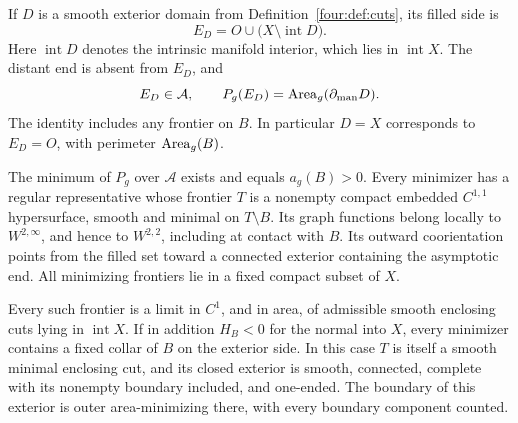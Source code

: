 If $D$ is a smooth exterior domain from Definition~\ref{four:def:cuts}, its
filled side is
\[
 E_D=O\cup\bigl(X\setminus\operatorname{int}D\bigr).
\]
Here $\operatorname{int}D$ denotes the intrinsic manifold interior, which
lies in $\operatorname{int}X$. The distant end is absent from $E_D$, and
\begin{equation}
 E_D\in\mathcal A,
 \qquad P_g(E_D)=\operatorname{Area}_g(\partial_{\mathrm{man}}D).
 \label{rig4:enc:cut-to-set}
\end{equation}
The identity includes any frontier on $B$. In particular $D=X$
corresponds to $E_D=O$, with perimeter $\operatorname{Area}_g(B)$.

\begin{proposition}
\label{rig4:enc:minimizing-hull}
The minimum of $P_g$ over $\mathcal A$ exists and equals $a_g(B)>0$.
Every minimizer has a regular representative whose frontier $T$ is a
nonempty compact embedded $C^{1,1}$ hypersurface, smooth and minimal on
$T\setminus B$. Its graph functions belong locally to $W^{2,\infty}$,
and hence to $W^{2,2}$, including at contact with $B$. Its outward
coorientation points from the filled set toward a connected exterior
containing the asymptotic end. All minimizing frontiers lie in a fixed
compact subset of $X$.

Every such frontier is a limit in $C^1$, and in area, of admissible smooth
enclosing cuts lying in $\operatorname{int}X$. If in addition
$H_B<0$ for the normal into $X$, every minimizer contains a fixed collar
of $B$ on the exterior side. In this case $T$ is itself a smooth
minimal enclosing cut, and its closed exterior is smooth, connected,
complete with its nonempty boundary included, and one-ended. The
boundary of this exterior is outer area-minimizing there, with every
boundary component counted.
\end{proposition}

